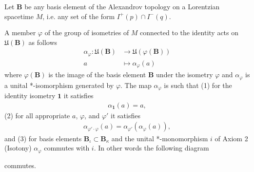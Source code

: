 \begin{axiom}
    Let $\mathbf{B}$ be any basis element of the Alexandrov topology on a Lorentzian spacetime $M$, i.e. any set of the form $I^+(p) \cap I^-(q)$.
    
    A member $\varphi$ of the group of isometries of $M$ connected to the identity acts on $\mathfrak{U}(\mathbf{B})$ as follows
    \begin{align}
        \alpha_\varphi : \mathfrak{U}(\mathbf{B}) &\longrightarrow \mathfrak{U}(\varphi(\mathbf{B})) \\
                                   a              &\longmapsto     \alpha_\varphi(a)
    \end{align}
    where $\varphi(\mathbf{B})$ is the image of the basis element $\mathbf{B}$ under the isometry $\varphi$ and $\alpha_\varphi$ is a unital *-isomorphism generated by $\varphi$. The map $\alpha_\varphi$ is such that (1) for the identity isometry $\mathbf{1}$ it satisfies
    \begin{align}
        \alpha_{\mathbf{1}}(a) = a,
    \end{align}
    (2) for all appropriate $a$, $\varphi$, and $\varphi'$ it satisfies
    \begin{align}
        \alpha_{\varphi' \cdot \varphi}(a) = \alpha_{\varphi'}(\alpha_{\varphi}(a)),
    \end{align}
    and (3) for basis elements $\mathbf{B}_\iota \subset \mathbf{B}_\kappa$ and the unital *-monomorphism $i$ of Axiom 2 (Isotony) $\alpha_\varphi$ commutes with $i$. In other words the following diagram

    \begin{center}
    \end{center}

    commutes.
\end{axiom}
